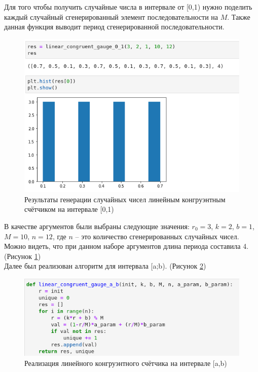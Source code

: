 \documentclass[14pt,fleqn]{extarticle}
\begin{document}
    Для того чтобы получить случайные числа в интервале от [0,1) нужно поделить каждый случайный сгенерированный элемент последовательности на $M$. Также данная функция выводит период сгенерированной последовательности.
    \begin{figure}[h]
        \centering \includegraphics[scale=0.52]{linear_congruent_gauge_0_1_result}
        \caption{Результаты генерации случайных чисел линейным конгруэнтным счётчиком на интервале [0,1)}
        \label{fig:linear_congruent_gauge_0_1_result}
    \end{figure}
    \newpage
    В качестве аргументов были выбраны следующие значения: $r_0 = 3$, $k = 2$, $b = 1$, $M = 10$, $n = 12$, где $n$ -- это количество сгенерированных случайных чисел. Можно видеть, что при данном наборе аргументов длина периода составила 4. (Рисунок \ref{fig:linear_congruent_gauge_0_1_result})\\
    \newline
    Далее был реализован алгоритм для интервала [a;b). (Рисунок \ref{fig:linear_congruent_gauge_a_b_code})
    \begin{figure}[h]
        \centering \includegraphics[scale=0.6]{linear_congruent_gauge_a_b_code}
        \caption{Реализация линейного конгруэнтного счётчика на интервале [a,b)}
        \label{fig:linear_congruent_gauge_a_b_code}
    \end{figure}
\end{document}
